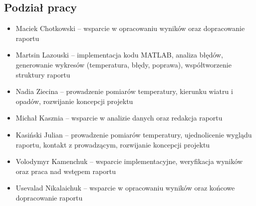 \documentclass[a4paper,12pt]{article}
\begin{document}
\subsection{Podział pracy}

\begin{itemize}
    \item Maciek Chotkowski -- wsparcie w opracowaniu wyników oraz dopracowanie raportu
    \item Martsin Lazouski -- implementacja kodu MATLAB, analiza błędów, generowanie wykresów (temperatura, błędy, poprawa), współtworzenie struktury raportu
    \item Nadia Ziecina -- prowadzenie pomiarów temperatury, kierunku wiatru i opadów, rozwijanie koncepcji projektu
    \item Michał Kasznia -- wsparcie w analizie danych oraz redakcja raportu
    \item Kasiński Julian -- prowadzenie pomiarów temperatury, ujednolicenie wyglądu raportu, kontakt z prowadzącym, rozwijanie koncepcji projektu
    \item Volodymyr Kamenchuk -- wsparcie implementacyjne, weryfikacja wyników oraz praca nad wstępem raportu
    \item Usevalad Nikalaichuk -- wsparcie w opracowaniu wyników oraz końcowe dopracowanie raportu
\end{itemize}
\end{document}
